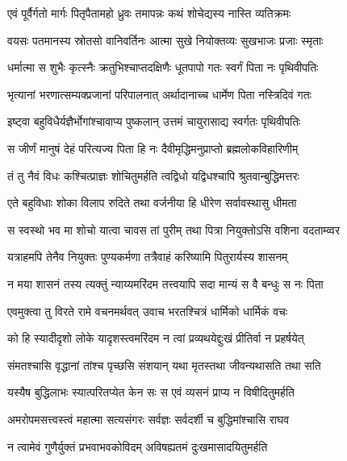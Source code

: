 \twolineshloka
{एवं पूर्वैर्गतो मार्गः पितृपैतामहो ध्रुवः}
{तमापन्नः कथं शोचेद्यस्य नास्ति व्यतिक्रमः} %

\twolineshloka
{वयसः पतमानस्य स्रोतसो वानिवर्तिनः}
{आत्मा सुखे नियोक्तव्यः सुखभाजः प्रजाः स्मृताः} %

\twolineshloka
{धर्मात्मा स शुभैः कृत्स्नैः क्रतुभिश्चाप्तदक्षिणैः}
{धूतपापो गतः स्वर्गं पिता नः पृथिवीपतिः} %

\twolineshloka
{भृत्यानां भरणात्सम्यक्प्रजानां परिपालनात्}
{अर्थादानाच्च धार्मेण पिता नस्त्रिदिवं गतः} %

\twolineshloka
{इष्ट्वा बहुविधैर्यज्ञैर्भोगांश्चावाप्य पुष्कलान्}
{उत्तमं चायुरासाद्य स्वर्गतः पृथिवीपतिः} %

\twolineshloka
{स जीर्णं मानुषं देहं परित्यज्य पिता हि नः}
{दैवीमृद्धिमनुप्राप्तो ब्रह्मलोकविहारिणीम्} %

\twolineshloka
{तं तु नैवं विधः कश्चित्प्राज्ञः शोचितुमर्हति}
{त्वद्विधो यद्विधश्चापि श्रुतवान्बुद्धिमत्तरः} %

\twolineshloka
{एते बहुविधाः शोका विलाप रुदिते तथा}
{वर्जनीया हि धीरेण सर्वावस्थासु धीमता} %

\twolineshloka
{स स्वस्थो भव मा शोचो यात्वा चावस तां पुरीम्}
{तथा पित्रा नियुक्तोऽसि वशिना वदताम्व्वर} %

\twolineshloka
{यत्राहमपि तेनैव नियुक्तः पुण्यकर्मणा}
{तत्रैवाहं करिष्यामि पितुरार्यस्य शासनम्} %

\twolineshloka
{न मया शासनं तस्य त्यक्तुं न्याय्यमरिंदम}
{तत्त्वयापि सदा मान्यं स वै बन्धुः स नः पिता} %

\twolineshloka
{एवमुक्त्वा तु विरते रामे वचनमर्थवत्}
{उवाच भरतश्चित्रं धार्मिको धार्मिकं वचः} %

\twolineshloka
{को हि स्यादीदृशो लोके यादृशस्त्वमरिंदम}
{न त्वां प्रव्यथयेद्दुःखं प्रीतिर्वा न प्रहर्षयेत्} %

\twolineshloka
{संमतश्चासि वृद्धानां तांश्च पृच्छसि संशयान्}
{यथा मृतस्तथा जीवन्यथासति तथा सति} %

\twolineshloka
{यस्यैष बुद्धिलाभः स्यात्परितप्येत केन सः}
{स एवं व्यसनं प्राप्य न विषीदितुमर्हति} %

\twolineshloka
{अमरोपमसत्त्वस्त्वं महात्मा सत्यसंगरः}
{सर्वज्ञः सर्वदर्शी च बुद्धिमांश्चासि राघव} %

\twolineshloka
{न त्वामेवं गुणैर्युक्तं प्रभवाभवकोविदम्}
{अविषह्यतमं दुःखमासादयितुमर्हति} %

